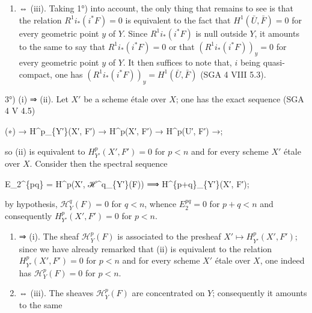 \documentclass[
  11pt,
  a4paper,
]{book}
\newenvironment{Shaded}{}{}
\newcommand{\NormalTok}[1]{#1}
\providecommand{\tightlist}{%
  \setlength{\itemsep}{0pt}\setlength{\parskip}{0pt}}
\begin{document}
\begin{enumerate}
\def\labelenumi{(\roman{enumi})}
\tightlist
\item
  ⇔ (iii). Taking 1°) into account, the only thing that remains to see
  is that the relation \(R^{1} i_{*} (i^{*} F) =
  0\) is equivalent to the fact that \(H^{1}(\bar{U}, \bar{F}) = 0\) for
  every geometric point \(y\) of \(Y\). Since \(R^{1} i_{*}
  (i^{*} F)\) is null outside \(Y\), it amounts to the same to say that
  \(R^{1} i_{*} (i^{*} F) = 0\) or that \((R^{1} i_{*}
  (i^{*} F))_{y} = 0\) for every geometric point \(y\) of \(Y\). It then
  suffices to note that, \(i\) being quasi-compact, one has
  \((R^{1} i_{*} (i^{*} F))_{y} = H^{1}(\bar{U}, \bar{F})\) (SGA 4 VIII
  5.3).
\end{enumerate}

3°) (i) ⇒ (ii). Let \(X'\) be a scheme étale over \(X\); one has the
exact sequence (SGA 4 V 4.5)

\begin{Shaded}
\begin{Highlighting}[]
\NormalTok{(∗)    → H\^{}p\_\{Y′\}(X′, F′) → H\^{}p(X′, F′) → H\^{}p(U′, F′) →;}
\end{Highlighting}
\end{Shaded}

so (ii) is equivalent to \(H^{p}_{Y'}(X', F') = 0\) for \(p < n\) and
for every scheme \(X'\) étale over \(X\). Consider then the spectral
sequence

\begin{Shaded}
\begin{Highlighting}[]
\NormalTok{E\_2\^{}\{pq\} = H\^{}p(X′, ℋ\^{}q\_\{Y′\}(F)) ⟹ H\^{}\{p+q\}\_\{Y′\}(X′, F′);}
\end{Highlighting}
\end{Shaded}

by hypothesis, \(\mathcal{H}^{q}_{Y}(F) = 0\) for \(q < n\), whence
\(E^{pq}_{2} = 0\) for \(p + q < n\) and consequently
\(H^{p}_{Y'}(X', F') = 0\) for \(p < n\).

\begin{enumerate}
\def\labelenumi{(\roman{enumi})}
\setcounter{enumi}{1}
\item
  ⇒ (i). The sheaf \(\mathcal{H}^{p}_{Y}(F)\) is associated to the
  presheaf \(X' \mapsto H^{p}_{Y'}(X', F')\); since we have already
  remarked that (ii) is equivalent to the relation
  \(H^{p}_{Y'}(X', F') = 0\) for \(p < n\) and for every scheme \(X'\)
  étale over \(X\), one indeed has \(\mathcal{H}^{p}_{Y}(F) = 0\) for
  \(p < n\).
\item
  ⇔ (iii). The sheaves \(\mathcal{H}^{p}_{Y}(F)\) are concentrated on
  \(Y\); consequently it amounts to the same
\end{enumerate}
\end{document}
